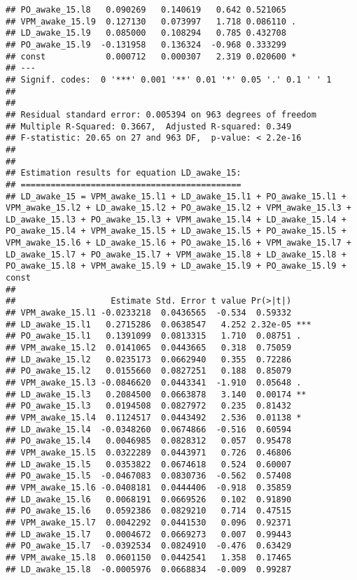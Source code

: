 \documentclass[
]{article}
\begin{document}
\begin{verbatim}
## PO_awake_15.l8   0.090269   0.140619   0.642 0.521065    
## VPM_awake_15.l9  0.127130   0.073997   1.718 0.086110 .  
## LD_awake_15.l9   0.085000   0.108294   0.785 0.432708    
## PO_awake_15.l9  -0.131958   0.136324  -0.968 0.333299    
## const            0.000712   0.000307   2.319 0.020600 *  
## ---
## Signif. codes:  0 '***' 0.001 '**' 0.01 '*' 0.05 '.' 0.1 ' ' 1
## 
## 
## Residual standard error: 0.005394 on 963 degrees of freedom
## Multiple R-Squared: 0.3667,  Adjusted R-squared: 0.349 
## F-statistic: 20.65 on 27 and 963 DF,  p-value: < 2.2e-16 
## 
## 
## Estimation results for equation LD_awake_15: 
## ============================================ 
## LD_awake_15 = VPM_awake_15.l1 + LD_awake_15.l1 + PO_awake_15.l1 + VPM_awake_15.l2 + LD_awake_15.l2 + PO_awake_15.l2 + VPM_awake_15.l3 + LD_awake_15.l3 + PO_awake_15.l3 + VPM_awake_15.l4 + LD_awake_15.l4 + PO_awake_15.l4 + VPM_awake_15.l5 + LD_awake_15.l5 + PO_awake_15.l5 + VPM_awake_15.l6 + LD_awake_15.l6 + PO_awake_15.l6 + VPM_awake_15.l7 + LD_awake_15.l7 + PO_awake_15.l7 + VPM_awake_15.l8 + LD_awake_15.l8 + PO_awake_15.l8 + VPM_awake_15.l9 + LD_awake_15.l9 + PO_awake_15.l9 + const 
## 
##                   Estimate Std. Error t value Pr(>|t|)    
## VPM_awake_15.l1 -0.0233218  0.0436565  -0.534  0.59332    
## LD_awake_15.l1   0.2715286  0.0638547   4.252 2.32e-05 ***
## PO_awake_15.l1   0.1391099  0.0813315   1.710  0.08751 .  
## VPM_awake_15.l2  0.0141065  0.0443665   0.318  0.75059    
## LD_awake_15.l2   0.0235173  0.0662940   0.355  0.72286    
## PO_awake_15.l2   0.0155660  0.0827251   0.188  0.85079    
## VPM_awake_15.l3 -0.0846620  0.0443341  -1.910  0.05648 .  
## LD_awake_15.l3   0.2084500  0.0663878   3.140  0.00174 ** 
## PO_awake_15.l3   0.0194508  0.0827972   0.235  0.81432    
## VPM_awake_15.l4  0.1124517  0.0443492   2.536  0.01138 *  
## LD_awake_15.l4  -0.0348260  0.0674866  -0.516  0.60594    
## PO_awake_15.l4   0.0046985  0.0828312   0.057  0.95478    
## VPM_awake_15.l5  0.0322289  0.0443971   0.726  0.46806    
## LD_awake_15.l5   0.0353822  0.0674618   0.524  0.60007    
## PO_awake_15.l5  -0.0467083  0.0830736  -0.562  0.57408    
## VPM_awake_15.l6 -0.0408181  0.0444406  -0.918  0.35859    
## LD_awake_15.l6   0.0068191  0.0669526   0.102  0.91890    
## PO_awake_15.l6   0.0592386  0.0829210   0.714  0.47515    
## VPM_awake_15.l7  0.0042292  0.0441530   0.096  0.92371    
## LD_awake_15.l7   0.0004672  0.0669273   0.007  0.99443    
## PO_awake_15.l7  -0.0392534  0.0824910  -0.476  0.63429    
## VPM_awake_15.l8  0.0601150  0.0442541   1.358  0.17465    
## LD_awake_15.l8  -0.0005976  0.0668834  -0.009  0.99287    

\end{verbatim}
\end{document}
